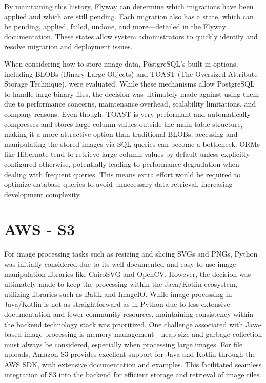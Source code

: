 By maintaining this history, Flyway can determine which migrations have been applied and which are still pending. Each migration also has a state, which can be pending, applied, failed, undone, and more—detailed in the Flyway documentation. These states allow system administrators to quickly identify and resolve migration and deployment issues.

When considering how to store image data, PostgreSQL’s built-in options, including BLOBs (Binary Large Objects) and TOAST (The Oversized-Attribute Storage Technique), were evaluated. While these mechanisms allow PostgreSQL to handle large binary files, the decision was ultimately made against using them due to performance concerns, maintenance overhead, scalability limitations, and company reasons.
Even though, TOAST is very performant and automatically compresses and stores large column values outside the main table structure, making it a more attractive option than traditional BLOBs, accessing and manipulating the stored images via SQL queries can become a bottleneck. ORMs like Hibernate tend to retrieve large column values by default unless explicitly configured otherwise, potentially leading to performance degradation when dealing with frequent queries. This means extra effort would be required to optimize database queries to avoid unnecessary data retrieval, increasing development complexity.


\section{AWS - S3}
For image processing tasks such as resizing and slicing SVGs and PNGs, Python was initially considered due to its well-documented and easy-to-use image manipulation libraries like CairoSVG and OpenCV. However, the decision was ultimately made to keep the processing within the Java/Kotlin ecosystem, utilizing libraries such as Batik and ImageIO. While image processing in Java/Kotlin is not as straightforward as in Python due to less extensive documentation and fewer community resources, maintaining consistency within the backend technology stack was prioritized. One challenge associated with Java-based image processing is memory management—heap size and garbage collection must always be considered, especially when processing large images. For file uploads, Amazon S3 provides excellent support for Java and Kotlin through the AWS SDK, with extensive documentation and examples. This facilitated seamless integration of S3 into the backend for efficient storage and retrieval of image tiles.

